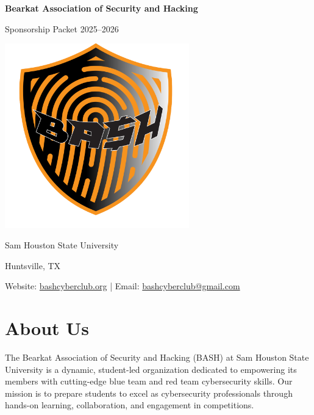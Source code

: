 \documentclass[11pt,letterpaper]{article}
\begin{document}
\begin{titlepage}
    \centering
    \vspace*{2cm}
    {\Huge\color{primaryorange}\textbf{Bearkat Association of Security and Hacking}\par}
    \vspace{0.5cm}
    {\Large Sponsorship Packet 2025--2026}\par
    \centering
    \vspace{20pt}
    \includegraphics[width=0.6\textwidth]{bash-logo-nobg.png}
    
  
    \vspace{4cm}
    {\large Sam Houston State University}\par
    \vspace{0.5cm}
    {\large Huntsville, TX}\par
    \vfill
    {\normalsize Website: \url{bashcyberclub.org} | Email: \href{mailto:bashcyberclub@gmail.com}{bashcyberclub@gmail.com}}\par
    \vspace{1cm}
\end{titlepage}

\section*{About Us}
The Bearkat Association of Security and Hacking (BASH) at Sam Houston State University is a dynamic, student-led organization dedicated to empowering its members with cutting-edge blue team and red team cybersecurity skills. Our mission is to prepare students to excel as cybersecurity professionals through hands-on learning, collaboration, and engagement in competitions. \\
\end{document}
